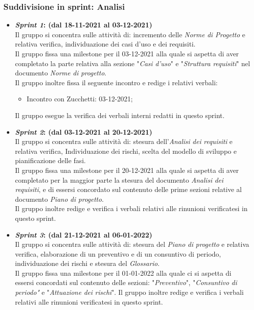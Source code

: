 \subsubsection{Suddivisione in sprint: Analisi}
\begin{itemize}
    \item \textbf{\textit{Sprint 1}: (dal 18-11-2021 al 03-12-2021)}\\
    Il gruppo si concentra sulle attività di: incremento delle \textit{Norme di Progetto} e relativa verifica, individuazione dei casi d'uso e dei requisiti.\\
    Il gruppo fissa una milestone per il 03-12-2021 alla quale si aspetta di aver completato la parte relativa alla sezione "\textit{Casi d'uso}" e "\textit{Struttura requisiti}" nel documento \textit{Norme di progetto}.\\
    Il gruppo inoltre fissa il seguente incontro e redige i relativi verbali:
    \begin{itemize}
        \item Incontro con Zucchetti: 03-12-2021;
    \end{itemize} 
    Il gruppo esegue la verifica dei verbali interni redatti in questo sprint.

    \item \textbf{\textit{Sprint 2}: (dal 03-12-2021 al 20-12-2021)}\\
    Il gruppo si concentra sulle attività di: stesura dell'\textit{Analisi dei requisiti} e relativa verifica, Individuazione dei rischi, scelta del modello di sviluppo e pianificazione delle fasi.\\
    Il gruppo fissa una milestone per il 20-12-2021 alla quale si aspetta di aver completato per la maggior parte la stesura del documento \textit{Analisi dei requisiti}, e di essersi concordato sul contenuto delle prime sezioni relative al documento \textit{Piano di progetto}.\\
    Il gruppo inoltre redige e verifica i verbali relativi alle rinunioni verificatesi in questo sprint.

    \item \textbf{\textit{Sprint 3}: (dal 21-12-2021 al 06-01-2022)}\\
    Il gruppo si concentra sulle attività di: stesura del \textit{Piano di progetto} e relativa verifica, elaborazione di un preventivo e di un consuntivo di periodo, individuazione dei rischi e stesura del \textit{Glossario}.\\
    Il gruppo fissa una milestone per il 01-01-2022 alla quale ci si aspetta di essersi concordati sul contenuto delle sezioni: "\textit{Preventivo}", "\textit{Consuntivo di periodo"} e "\textit{Attuazione dei rischi}". 
    Il gruppo inoltre redige e verifica i verbali relativi alle rinunioni verificatesi in questo sprint.


\end{itemize}
